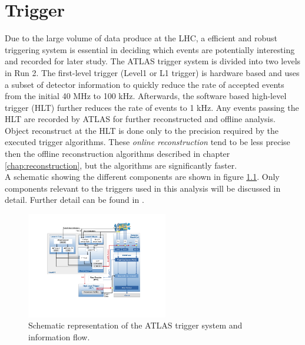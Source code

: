 \chapter{Trigger}
\label{chap:trigger}

\indent Due to the large volume of data produce at the LHC, a efficient and robust triggering system is essential in deciding which events are potentially interesting and recorded for later study.  The ATLAS trigger system is divided into two levels in Run 2.  The first-level trigger (Level1 or L1 trigger) is hardware based and uses a subset of detector information to quickly reduce the rate of accepted events from the initial 40 MHz to 100 kHz.  Afterwards, the software based high-level trigger (HLT) further reduces the rate of events to 1 kHz.  Any events passing the HLT are recorded by ATLAS for further reconstructed and offline analysis. \\

\indent Object reconstruct at the HLT is done only to the precision required by the executed trigger algorithms.  These {\it online reconstruction} tend to be less precise then the offline reconstruction algorithms described in chapter \ref{chap:reconstruction}, but the algorithms are significantly faster. \\

\indent A schematic showing the different components are shown in figure \ref{fig:trigScheme}.  Only components relevant to the triggers used in this analysis will be discussed in detail.  Further detail can be found in \cite{Trigger2015}.

\begin{figure}[htb]
  \begin{center}
    \includegraphics[width=0.55\textwidth]{figures/trigger/tdaq-schematic.png}\hspace{0.05\textwidth}
\end{center}
\caption{Schematic representation of the ATLAS trigger system and information flow.\cite{Trigger2015}}
\label{fig:trigScheme} 
\end{figure}

